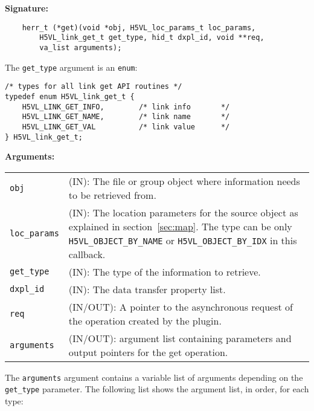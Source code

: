 \begin{mdframed}[style=bgbox]
\textbf{Signature:}
\begin{lstlisting}
    herr_t (*get)(void *obj, H5VL_loc_params_t loc_params, 
        H5VL_link_get_t get_type, hid_t dxpl_id, void **req, 
        va_list arguments);
\end{lstlisting}

The \texttt{get\_type} argument is an \texttt{enum}:
\begin{lstlisting}
/* types for all link get API routines */
typedef enum H5VL_link_get_t {
    H5VL_LINK_GET_INFO,        /* link info       */
    H5VL_LINK_GET_NAME,        /* link name       */
    H5VL_LINK_GET_VAL          /* link value      */
} H5VL_link_get_t;
\end{lstlisting}

\textbf{Arguments:}\\
\begin{tabular}{l p{10cm}}
  \texttt{obj} & (IN): The file or group object where information needs to be
  retrieved from.\\
  \texttt{loc\_params} & (IN): The location parameters for the source
  object as explained in section~\ref{sec:map}. The type can be only \texttt{H5VL\_OBJECT\_BY\_NAME} or \texttt{H5VL\_OBJECT\_BY\_IDX} in this
  callback.\\ 
  \texttt{get\_type} & (IN): The type of the information to retrieve.\\
  \texttt{dxpl\_id} & (IN): The data transfer property list.\\
  \texttt{req} & (IN/OUT): A pointer to the asynchronous request of the
  operation created by the plugin.\\
  \texttt{arguments} & (IN/OUT): argument list containing parameters and
  output pointers for the get operation. \\
\end{tabular}
\end{mdframed}

The \texttt{arguments} argument contains a variable list of arguments
depending on the \texttt{get\_type} parameter. The following list shows
the argument list, in order, for each type:

